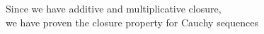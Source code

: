 \documentclass[preview]{standalone}
\begin{document}
\begin{center}
Since we have additive and multiplicative closure,\\we have proven the closure property for Cauchy sequences
\end{center}
\end{document}
